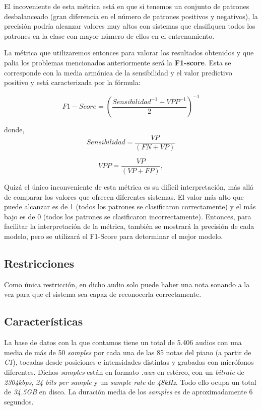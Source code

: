 \documentclass[12pt]{article}
\begin{document}
\smallskip
El incoveniente de esta métrica está en que si tenemos un conjunto de patrones desbalanceado (gran diferencia en el número de
patrones positivos y negativos), la precisión podría alcanzar valores muy altos con sistemas que clasifiquen todos los patrones en la clase con mayor número de ellos
en el entrenamiento.

\bigskip
La métrica que utilizaremos entonces para valorar los resultados obtenidos y que palia los problemas
mencionados anteriormente será la \textbf{F1-score}. Esta se corresponde con la media armónica de la sensibilidad y el
valor predictivo positivo y está caracterizada por la fórmula: 

\begin{equation}
	F1-Score = \left(\frac{Sensibilidad^{-1} + VPP^{-1}}{2}\right)^{-1}
\end{equation}

donde, 
\begin{equation}
	Sensibilidad = \frac{VP}{(FN + VP)}
\end{equation}

\begin{equation}
	VPP = \frac{VP}{(VP + FP)}, 
\end{equation}

\smallskip
Quizá el único inconveniente de esta métrica es su difícil interpretación, más allá de comparar los valores que ofrecen diferentes sistemas.
El valor más alto que puede alcanzar es de 1 (todos los patrones se clasificaron correctamente) y el más bajo es de 0 (todos los patrones se clasificaron
incorrectamente). Entonces, para facilitar la interpretación de la métrica, también se mostrará la precisión de cada modelo, pero se utilizará
el F1-Score para determinar el mejor modelo.

\subsection{Restricciones}
\bigskip
Como única restricción, en dicho audio solo puede haber una nota sonando a la vez para que el sistema sea capaz de reconocerla correctamente.

\subsection{Características}
\bigskip
La base de datos con la que contamos tiene un total de 5.406 audios con una media de más de 50 \textit{samples} por cada una de las 85 notas del piano (a partir de \textit{C1}), tocadas
desde posiciones e intensidades distintas y grabadas con micrófonos diferentes. Dichos \textit{samples} están en formato \textit{.wav} en estéreo, con un 
\textit{bitrate} de \textit{2304kbps}, \textit{24 bits per sample} y un \textit{sample rate} de \textit{48kHz}. Todo ello ocupa un total de \textit{34.5GB} en disco.
La duración media de los \textit{samples} es de aproximadamente 6 segundos.
\end{document}
